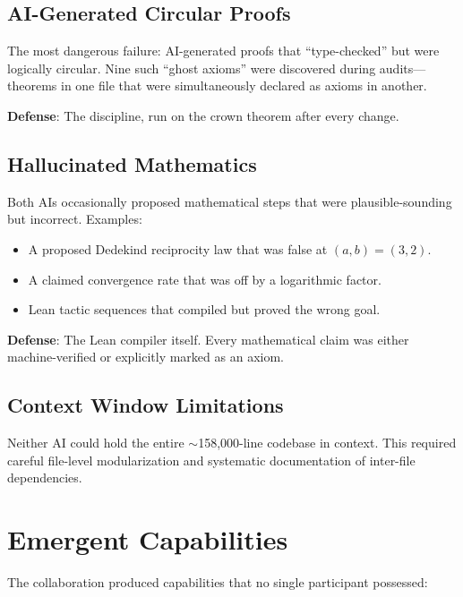 \documentclass[11pt,a4paper]{article}
\begin{document}
\subsection{AI-Generated Circular Proofs}

The most dangerous failure: AI-generated proofs that ``type-checked''
but were logically circular. Nine such ``ghost axioms'' were
discovered during audits---theorems in one file that were
simultaneously declared as axioms in another.

\textbf{Defense}: The  discipline, run on the
crown theorem after every change.

\subsection{Hallucinated Mathematics}

Both AIs occasionally proposed mathematical steps that were
plausible-sounding but incorrect. Examples:
\begin{itemize}
  \item A proposed Dedekind reciprocity law that was false at
    $(a,b) = (3,2)$.
  \item A claimed convergence rate that was off by a logarithmic
    factor.
  \item Lean tactic sequences that compiled but proved the wrong
    goal.
\end{itemize}

\textbf{Defense}: The Lean compiler itself. Every mathematical claim
was either machine-verified or explicitly marked as an axiom.

\subsection{Context Window Limitations}

Neither AI could hold the entire $\sim$158{,}000-line codebase in context.
This required careful file-level modularization and systematic
documentation of inter-file dependencies.

\section{Emergent Capabilities}

The collaboration produced capabilities that no single participant
possessed:
\end{document}
